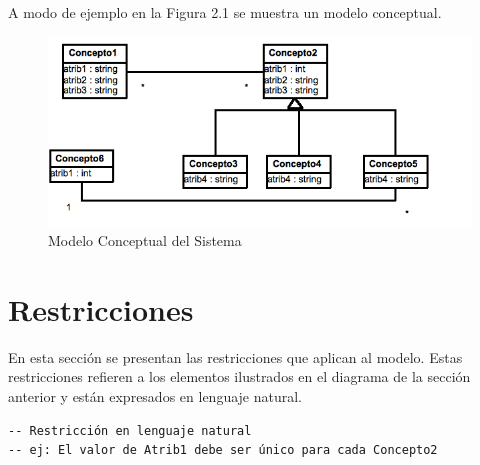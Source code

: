 \documentclass[10pt,spanish]{article}
\numberwithin{figure}{section} %
\begin{document}
\begin{siderules}
A modo de ejemplo en la Figura 2.1 se muestra un modelo conceptual.\\
\begin{figure}[H] %
    \centering    \includegraphics[]{ModeloDominio/Fig2-1.png}
    \caption{Modelo Conceptual del Sistema}
\end{figure}
\end{siderules}

\section{Restricciones}
En esta sección se presentan las restricciones que aplican al modelo. Estas restricciones refieren a los
elementos ilustrados en el diagrama de la sección anterior y están expresados en lenguaje natural.
\begin{siderules}
\begin{verbatim}
-- Restricción en lenguaje natural
-- ej: El valor de Atrib1 debe ser único para cada Concepto2
\end{verbatim}
\end{siderules}
\end{document}
